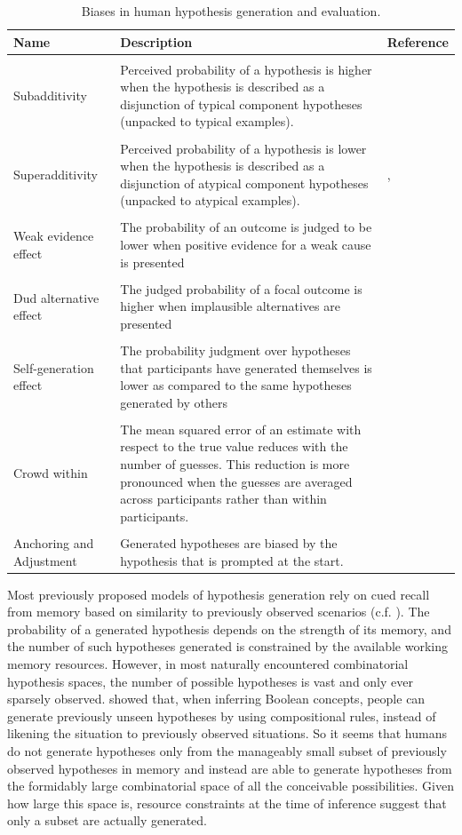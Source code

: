 \begin{table}[htbp]
\centering
\caption{Biases in human hypothesis generation and evaluation.}
\label{tab:biases}
\begin{tabular}{p{}>{\raggedright}p{}>{\raggedright}p{}}
\toprule
\textbf{Name}&\textbf{Description}& \textbf{Reference}\tabularnewline
\midrule \tabularnewline
Subadditivity& Perceived probability of a hypothesis is higher when the hypothesis is described as a disjunction of typical component hypotheses (unpacked to typical examples). & \citet{fox1998belief} \tabularnewline\tabularnewline
Superadditivity& Perceived probability of a hypothesis is lower when the hypothesis is described as a disjunction of atypical component hypotheses (unpacked to atypical examples). & \citet{super}, \citet{hadjichristidis1999opening} \tabularnewline\tabularnewline
Weak evidence effect& The probability of an outcome is judged to be lower when positive evidence for a weak cause is presented & \citet{weak}\tabularnewline\tabularnewline
Dud alternative effect & The judged probability of a focal outcome is higher when implausible alternatives are presented & \citet{dud}\tabularnewline\tabularnewline
Self-generation effect & The probability judgment over hypotheses that participants have generated themselves is lower as compared to the same hypotheses generated by others& \citet{koriat1980,conf} \tabularnewline\tabularnewline
Crowd within & The mean squared error of an estimate with respect to the true value reduces with the number of guesses. This reduction is more pronounced when the guesses are averaged across participants rather than within participants. & \citet{vul08}
\tabularnewline\tabularnewline
Anchoring and Adjustment & Generated hypotheses are biased by the hypothesis that is prompted at the start. & \citet{tversky} \tabularnewline
\bottomrule
\end{tabular}
\end{table}

Most previously proposed models of hypothesis generation rely on cued recall from memory based on similarity to previously observed scenarios (c.f. \citet{Thomas2008, gennaioli2010comes}). The probability of a generated hypothesis depends on the strength of its memory, and the number of such hypotheses generated is constrained by the available working memory resources. However, in most naturally encountered combinatorial hypothesis spaces, the number of possible hypotheses is vast and only ever sparsely observed. \cite{Goodman2008} showed that, when inferring Boolean concepts, people can generate previously unseen hypotheses by using compositional rules, instead of likening the situation to previously observed situations. So it seems that humans do not generate hypotheses only from the manageably small subset of previously observed hypotheses in memory and instead are able to generate hypotheses from the formidably large combinatorial space of all the conceivable possibilities. Given how large this space is, resource constraints at the time of inference suggest that only a subset are actually generated.

